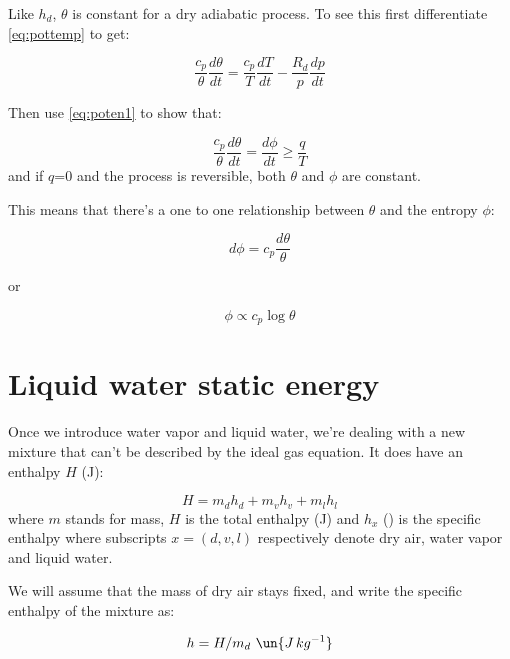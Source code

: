 \documentclass[12pt]{article}
\begin{document}
Like $h_d$, $\theta$ is constant for a dry adiabatic process. To see this
first  differentiate \eqref{eq:pottemp} to get:

\begin{equation}
  \label{eq:differ}
\frac{c_p}{\theta} \frac{d \theta} {dt} =  \frac{c_p}{T} \frac{dT}{dt} - \frac{R_d }{ p} \frac{dp}{dt}
\end{equation}

Then use \eqref{eq:poten1} to show that:

\begin{equation}
  \label{eq:thetaIsS}
  \frac{c_p}{\theta} \frac{d \theta} {dt} = \frac{d\phi} {dt} \geq \frac{q}{T}
\end{equation}
and if $q$=0 and the process is reversible, both $\theta$ and $\phi$ are constant.

This means that there's a one to one relationship between $\theta$ and the
entropy $\phi$:

\begin{equation}
  \label{eq:entrop1}
  d\phi = c_p \frac{d \theta}{\theta}
\end{equation}

or 

\begin{equation}
  \label{eq:entrop2}
  \phi \propto  c_p \log \theta
\end{equation}

\section{Liquid water static energy}
\label{sec:liquid-water-static}


Once we introduce water vapor and liquid water, we're dealing
with a new mixture that can't be described by the ideal gas equation.
It does have an enthalpy $H$ (J):

\begin{equation}
  \label{eq:hmix}
  H=m_d h_d + m_v h_v + m_l h_l
\end{equation}
where $m$ stands for mass, $H$ is the total enthalpy (J) and $h_x$ 
() is the specific enthalpy where
subscripts $x=(d,v,l)$ respectively denote dry air, water vapor
and liquid water. 

We will assume that the mass of dry air stays fixed, and
write the specific enthalpy of the mixture as:

\begin{equation}
  \label{eq:mix}
  h = H/m_d\ \un{J\,kg^{-1}}
\end{equation}
\end{document}
